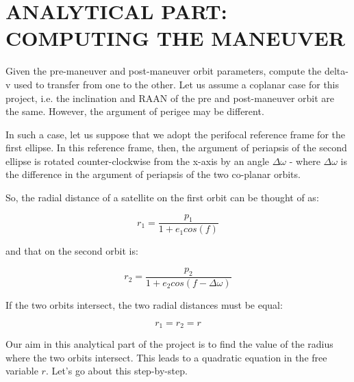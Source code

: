 \documentclass[12pt, letterpaper]{aiaa-tc}
\begin{document}
\section{ANALYTICAL PART: COMPUTING THE MANEUVER}

Given the pre-maneuver and post-maneuver orbit parameters, compute the delta-v used to transfer from one to the
other. Let us assume a coplanar case for this project, i.e. the inclination and RAAN of the pre and post-maneuver
orbit are the same. However, the argument of perigee may be different.

In such a case, let us suppose that we adopt the perifocal reference frame for the first ellipse. In this reference
frame, then, the argument of periapsis of the second ellipse is rotated counter-clockwise from the x-axis by an
angle $\Delta\omega$ - where $\Delta\omega$ is the difference in the argument of periapsis of the two co-planar orbits.

So, the radial distance of a satellite on the first orbit can be thought of as:

\[ r_1=\frac{p_1}{1+e_1 cos(f)} \]

and that on the second orbit is:

\[ r_2=\frac{p_2}{1+e_2 cos(f-\Delta\omega)} \]

If the two orbits intersect, the two radial distances must be equal:

\[ r_1=r_2=r \]

Our aim in this analytical part of the project is to find the value of the radius where the two orbits intersect. This
leads to a quadratic equation in the free variable $r$. Let’s go about this step-by-step.
\end{document}
